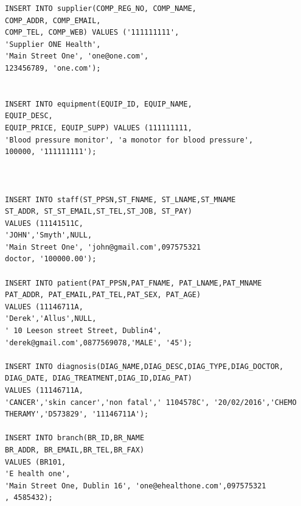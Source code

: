 \documentclass{article}
\begin{document}
\begin{lstlisting}
INSERT INTO supplier(COMP_REG_NO, COMP_NAME,
COMP_ADDR, COMP_EMAIL,
COMP_TEL, COMP_WEB) VALUES ('111111111',
'Supplier ONE Health',
'Main Street One', 'one@one.com',
123456789, 'one.com');


INSERT INTO equipment(EQUIP_ID, EQUIP_NAME,
EQUIP_DESC,
EQUIP_PRICE, EQUIP_SUPP) VALUES (111111111,
'Blood pressure monitor', 'a monotor for blood pressure',
100000, '111111111');



INSERT INTO staff(ST_PPSN,ST_FNAME, ST_LNAME,ST_MNAME
ST_ADDR, ST_ST_EMAIL,ST_TEL,ST_JOB, ST_PAY) 
VALUES (11141511C,
'JOHN','Smyth',NULL,
'Main Street One', 'john@gmail.com',097575321
doctor, '100000.00');

INSERT INTO patient(PAT_PPSN,PAT_FNAME, PAT_LNAME,PAT_MNAME
PAT_ADDR, PAT_EMAIL,PAT_TEL,PAT_SEX, PAT_AGE) 
VALUES (11146711A,
'Derek','Allus',NULL,
' 10 Leeson street Street, Dublin4', 'derek@gmail.com',0877569078,'MALE', '45');

INSERT INTO diagnosis(DIAG_NAME,DIAG_DESC,DIAG_TYPE,DIAG_DOCTOR,
DIAG_DATE, DIAG_TREATMENT,DIAG_ID,DIAG_PAT) 
VALUES (11146711A,
'CANCER','skin cancer','non fatal',' 1104578C', '20/02/2016','CHEMO THERAMY','D573829', '11146711A');

INSERT INTO branch(BR_ID,BR_NAME
BR_ADDR, BR_EMAIL,BR_TEL,BR_FAX) 
VALUES (BR101,
'E health one',
'Main Street One, Dublin 16', 'one@ehealthone.com',097575321
, 4585432);



\end{lstlisting}






















\pagebreak
\end{document}

